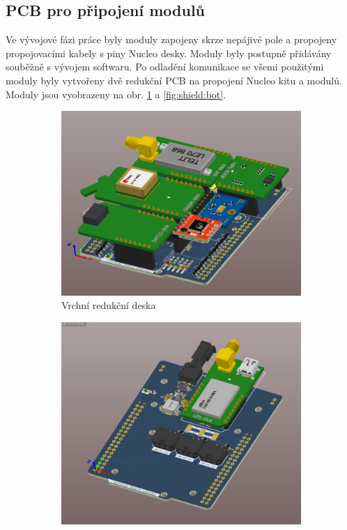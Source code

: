 \documentclass[twoside]{ctuthesis}
\theoremstyle{plain}
\theoremstyle{definition}
\theoremstyle{note}
\begin{document}
		\subsection{PCB pro připojení modulů}
		Ve vývojové fázi práce byly moduly zapojeny skrze nepájivé pole a propojeny propojovacími kabely s piny Nucleo desky. Moduly byly postupně přidávány souběžně s vývojem softwaru. Po odladění komunikace se všemi použitými moduly byly vytvořeny dvě redukční PCB na propojení Nucleo kitu a modulů. Moduly jsou vyobrazeny na obr. \ref{fig:shield:top} a \ref{fig:shield:bot}. 

		\begin{figure}[hbtp]
			\centering
			\begin{subfigure}{0.3\textwidth}
				\centering
				\includegraphics[height=0.7\linewidth]{Figures/shield_top.png} 
				\caption{Vrchní redukční deska}
				\label{fig:shield:top}
			\end{subfigure}%
			\begin{subfigure}{.3\textwidth}
				\centering
				\includegraphics[height=0.7\linewidth]{Figures/shield_bot.png}

\end{subfigure}
\end{figure}
\end{document}
